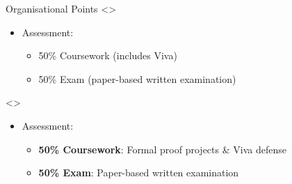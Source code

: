\documentclass[compress,10pt,xcolor=dvipsnames]{beamer}
\begin{document}
\begin{frame}{Organisational Points}
\note<\assesment>{
\begin{itemize}
\item Assessment:
  \begin{itemize}
  \item 50\% Coursework (includes Viva)
  \item 50\% Exam (paper-based written examination)
  \end{itemize}
\end{itemize}
}

\only<\assesment>{
\begin{itemize}
\item Assessment:
  \begin{itemize}
  \item \textbf{50\% Coursework}: Formal proof projects \& Viva defense
  \item \textbf{50\% Exam}: Paper-based written examination
  \end{itemize}
\end{itemize}
}
\end{frame}
\end{document}
